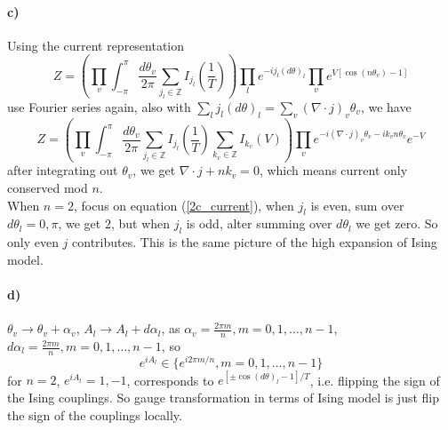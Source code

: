 \paragraph*{c)}
Using the current representation
\begin{equation} \label{2c_current}
    Z 
    = \left(
        \prod_{v} \int_{-\pi}^{\pi} \frac{d\theta_{v}}{2\pi} 
        \sum_{j_{l} \in \mathbb{Z} } I_{j_{l}}(\frac{1}{T})
        \right)
    \prod_{l} e^{-ij_l (d\theta)_l}
    \prod_{v} e^{V[\cos(n\theta_v)-1]}
\end{equation}
use Fourier series again, also with $ \sum_l j_l (d\theta)_l = \sum_v (\nabla \cdot j)_v \theta_v $, we have
\begin{equation}
    Z 
    = \left(
        \prod_{v} \int_{-\pi}^{\pi} \frac{d\theta_{v}}{2\pi} 
        \sum_{j_{l} \in \mathbb{Z} } I_{j_{l}}(\frac{1}{T})
        \sum_{k_{v} \in \mathbb{Z} } I_{k_{v}}(V)
        \right)
    \prod_{v} e^{-i (\nabla \cdot j)_v \theta_v  -ik_v n\theta_v}e^{-V}
\end{equation}
after integrating out $\theta_v$, we get $\nabla \cdot j  + nk_v = 0 $, which means current only conserved mod $n$.\\
When $n =2$, focus on equation (\ref{2c_current}), when $j_l$ is even, sum over $d \theta_l = 0, \pi $, we get $2$, but when $j_l $ is odd, alter summing over $d\theta_l$ we get zero. So only even $j$ contributes. This is the same picture of the high expansion of Ising model.

\paragraph*{d)}
$\theta_v \rightarrow \theta_v + \alpha_v$, $ A_l \rightarrow A_l + d \alpha_l$, as $ \alpha_v = \frac{2\pi m}{n}, m = 0, 1, \dots, n-1 $, $ d\alpha_l = \frac{2\pi m}{n}, m = 0, 1, \dots, n-1 $, so 
\begin{equation}
    e^{iA_l} \in \{ e^{i2\pi m /n}, m = 0, 1, \dots, n-1 \}
\end{equation}
for $n = 2$, $ e^{iA_l} = 1, -1$, corresponds to $ e^{[\pm \cos (d\theta)_l -1]/T}$, i.e. flipping the sign of the Ising couplings.
So gauge transformation  in terms of Ising model is just flip the sign of the couplings locally.